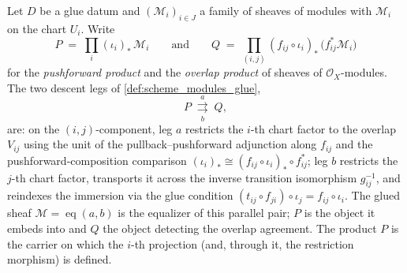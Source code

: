 \begin{definition}

  \label{def:gr_glue_equalizer}
  Let \(D\) be a glue datum and \((\mathcal{M}_i)_{i \in J}\) a family of sheaves of
  modules with \(\mathcal{M}_i\) on the chart \(U_i\). Write
  \[
    P \;=\; \prod_{i} (\iota_i)_{*}\,\mathcal{M}_i
    \qquad\text{and}\qquad
    Q \;=\; \prod_{(i,j)} (f_{ij} \circ \iota_i)_{*}\,\bigl(f_{ij}^{*}\mathcal{M}_i\bigr)
  \]
  for the \emph{pushforward product} and the \emph{overlap product} of sheaves of
  \(\mathcal{O}_X\)-modules. The two descent legs of \cref{def:scheme_modules_glue},
  \[
    P \;\underset{b}{\overset{a}{\rightrightarrows}}\; Q,
  \]
  are: on the \((i,j)\)-component, leg \(a\) restricts the \(i\)-th chart factor to
  the overlap \(V_{ij}\) using the unit of the pullback--pushforward adjunction along
  \(f_{ij}\) and the pushforward-composition comparison
  \((\iota_i)_{*} \cong (f_{ij} \circ \iota_i)_{*} \circ f_{ij}^{*}\); leg \(b\)
  restricts the \(j\)-th chart factor, transports it across the inverse transition
  isomorphism \(g_{ij}^{-1}\), and reindexes the immersion via the glue condition
  \((t_{ij} \circ f_{ji}) \circ \iota_j = f_{ij} \circ \iota_i\). The glued sheaf
  \(\mathcal{M} = \operatorname{eq}(a,b)\) is the equalizer of this parallel pair;
  \(P\) is the object it embeds into and \(Q\) the object detecting the overlap
  agreement. The product \(P\) is the carrier on which the \(i\)-th projection (and,
  through it, the restriction morphism) is defined.
\end{definition}

